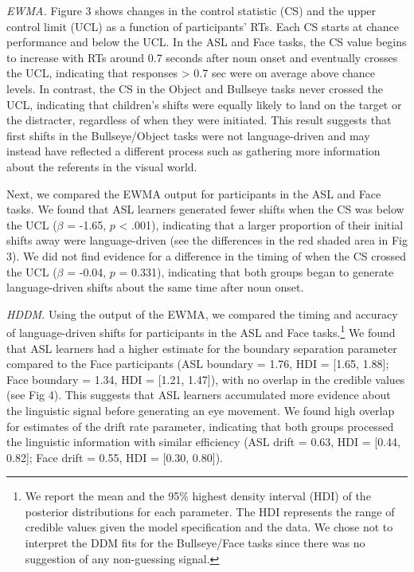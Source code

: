 \documentclass[english,floatsintext,man]{apa6}
\theoremstyle{definition}
\theoremstyle{definition}
\theoremstyle{definition}
\theoremstyle{remark}
\begin{document}
\emph{EWMA.} Figure 3 shows changes in the control statistic (CS) and
the upper control limit (UCL) as a function of participants' RTs. Each
CS starts at chance performance and below the UCL. In the ASL and Face
tasks, the CS value begins to increase with RTs around 0.7 seconds after
noun onset and eventually crosses the UCL, indicating that responses
\textgreater{} 0.7 sec were on average above chance levels. In contrast,
the CS in the Object and Bullseye tasks never crossed the UCL,
indicating that children's shifts were equally likely to land on the
target or the distracter, regardless of when they were initiated. This
result suggests that first shifts in the Bullseye/Object tasks were not
language-driven and may instead have reflected a different process such
as gathering more information about the referents in the visual world.

Next, we compared the EWMA output for participants in the ASL and Face
tasks. We found that ASL learners generated fewer shifts when the CS was
below the UCL (\(\beta\) = -1.65, \(p\) \textless{} .001), indicating
that a larger proportion of their initial shifts away were
language-driven (see the differences in the red shaded area in Fig 3).
We did not find evidence for a difference in the timing of when the CS
crossed the UCL (\(\beta\) = -0.04, \(p\) = 0.331), indicating that both
groups began to generate language-driven shifts about the same time
after noun onset.

\emph{HDDM.} Using the output of the EWMA, we compared the timing and
accuracy of language-driven shifts for participants in the ASL and Face
tasks.\footnote{We report the mean and the 95\% highest density interval
  (HDI) of the posterior distributions for each parameter. The HDI
  represents the range of credible values given the model specification
  and the data. We chose not to interpret the DDM fits for the
  Bullseye/Face tasks since there was no suggestion of any non-guessing
  signal.} We found that ASL learners had a higher estimate for the
boundary separation parameter compared to the Face participants (ASL
boundary = 1.76, HDI = {[}1.65, 1.88{]}; Face boundary = 1.34, HDI =
{[}1.21, 1.47{]}), with no overlap in the credible values (see Fig 4).
This suggests that ASL learners accumulated more evidence about the
linguistic signal before generating an eye movement. We found high
overlap for estimates of the drift rate parameter, indicating that both
groups processed the linguistic information with similar efficiency (ASL
drift = 0.63, HDI = {[}0.44, 0.82{]}; Face drift = 0.55, HDI = {[}0.30,
0.80{]}).
\end{document}
